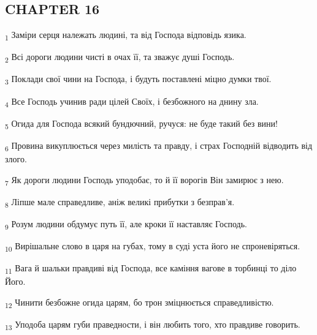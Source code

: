 \subsection{CHAPTER 16}
\begin{tcolorbox}
\textsubscript{1} Заміри серця належать людині, та від Господа відповідь язика.
\end{tcolorbox}
\begin{tcolorbox}
\textsubscript{2} Всі дороги людини чисті в очах її, та зважує душі Господь.
\end{tcolorbox}
\begin{tcolorbox}
\textsubscript{3} Поклади свої чини на Господа, і будуть поставлені міцно думки твої.
\end{tcolorbox}
\begin{tcolorbox}
\textsubscript{4} Все Господь учинив ради цілей Своїх, і безбожного на днину зла.
\end{tcolorbox}
\begin{tcolorbox}
\textsubscript{5} Огида для Господа всякий бундючний, ручуся: не буде такий без вини!
\end{tcolorbox}
\begin{tcolorbox}
\textsubscript{6} Провина викуплюється через милість та правду, і страх Господній відводить від злого.
\end{tcolorbox}
\begin{tcolorbox}
\textsubscript{7} Як дороги людини Господь уподобає, то й її ворогів Він замирює з нею.
\end{tcolorbox}
\begin{tcolorbox}
\textsubscript{8} Ліпше мале справедливе, аніж великі прибутки з безправ'я.
\end{tcolorbox}
\begin{tcolorbox}
\textsubscript{9} Розум людини обдумує путь її, але кроки її наставляє Господь.
\end{tcolorbox}
\begin{tcolorbox}
\textsubscript{10} Вирішальне слово в царя на губах, тому в суді уста його не спроневіряться.
\end{tcolorbox}
\begin{tcolorbox}
\textsubscript{11} Вага й шальки правдиві від Господа, все каміння вагове в торбинці то діло Його.
\end{tcolorbox}
\begin{tcolorbox}
\textsubscript{12} Чинити безбожне огида царям, бо трон зміцнюється справедливістю.
\end{tcolorbox}
\begin{tcolorbox}
\textsubscript{13} Уподоба царям губи праведности, і він любить того, хто правдиве говорить.
\end{tcolorbox}
